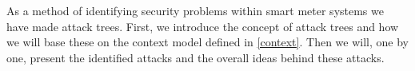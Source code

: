 
As a method of identifying security problems within smart meter systems we have made attack trees.
First, we introduce the concept of attack trees and how we will base these on the context model defined in \cref{context}.
Then we will, one by one, present the identified attacks and the overall ideas behind these attacks.
